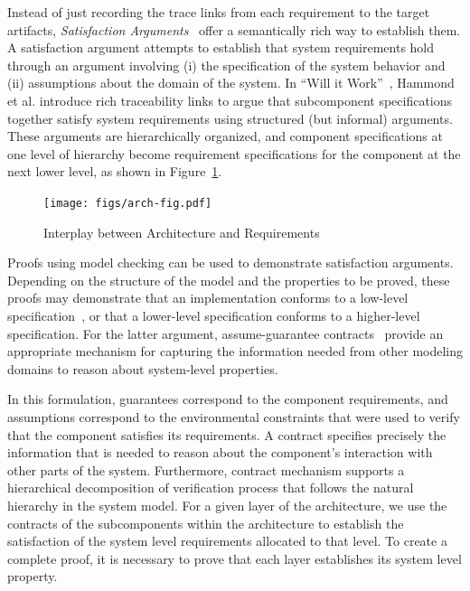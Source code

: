 



\iffalse
Instead of just recording the trace links from each requirement to the target artifacts, \emph{Satisfaction Arguments}~\cite{zave1997four,Hammond01:WiW} offer a semantically rich way to establish them.
A satisfaction argument attempts to establish that system requirements hold through an argument involving (i) the specification of the system behavior and (ii) assumptions about the domain of the system.
In ``Will it Work''~\cite{Hammond01:WiW}, Hammond et al. introduce rich traceability links to argue that subcomponent specifications together satisfy system requirements using structured (but informal) arguments.  These arguments are hierarchically organized, and component specifications at one level of hierarchy become requirement specifications for the component at the next lower level, as shown in Figure~\ref{fig:arch-fig}.

\begin{figure}
 \centering
  \texttt{[image: figs/arch-fig.pdf]}
  \caption{Interplay between Architecture and Requirements}
  \label{fig:arch-fig}
\end{figure}


Proofs using model checking can be used to demonstrate satisfaction arguments.  Depending on the structure of the model and the properties to be proved, these proofs may demonstrate that an implementation conforms to a low-level specification~\cite{Miller10:CACM}, or that a lower-level specification conforms to a higher-level specification.  For the latter argument, assume-guarantee contracts~\cite{NFM2012:CoGaMiWhLaLu,Whalen13:WhatHow:TwinPeaksIEEESoftware} provide an appropriate mechanism for capturing the information needed from other modeling domains to reason about system-level properties.

In this formulation, guarantees correspond to the component requirements, and assumptions correspond to the environmental constraints that were used to verify that the component satisfies its requirements.  A contract specifies precisely the information that is needed to reason about the component’s interaction with other parts of the system. Furthermore, contract mechanism supports a hierarchical decomposition of verification process that follows the natural hierarchy in the system model.  For a given layer of the architecture, we use the contracts of the subcomponents within the architecture to establish the satisfaction of the system level requirements allocated to that level.  To create a complete proof, it is necessary to prove that each layer  establishes its system level property.

